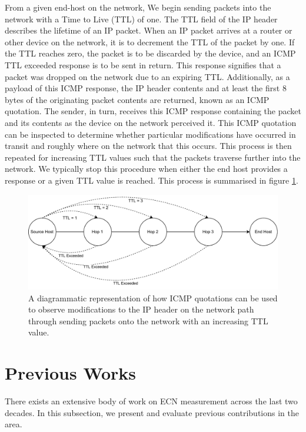 \documentclass{l4proj}
\begin{document}
From a given end-host on the network, We begin sending packets into the network with a Time to Live (TTL) of one. The TTL field of the IP header describes the lifetime of an IP packet. When an IP packet arrives at a router or other device on the network, it is to decrement the TTL of the packet by one. If the TTL reaches zero, the packet is to be discarded by the device, and an ICMP TTL exceeded response is to be sent in return. This response signifies that a packet was dropped on the network due to an expiring TTL.
Additionally, as a payload of this ICMP response, the IP header contents and at least the first 8 bytes of the originating packet contents are returned, known as an ICMP quotation. The sender, in turn, receives this ICMP response containing the packet and its contents as the device on the network perceived it. This ICMP quotation can be inspected to determine whether particular modifications have occurred in transit and roughly where on the network that this occurs. This process is then repeated for increasing TTL values such that the packets traverse further into the network. We typically stop this procedure when either the end host provides a response or a given TTL value is reached. This process is summarised in figure \ref{fig:icmp}.

\begin{figure}[H]

\centering
\includegraphics[width=14cm,keepaspectratio]{dissertation/images/icmp.pdf}
\caption{A diagrammatic representation of how ICMP quotations can be used to observe modifications to the IP header on the network path through sending packets onto the network with an increasing TTL value.}
\label{fig:icmp}
\end{figure}

\section{Previous Works}

There exists an extensive body of work on ECN measurement across the last two decades. In this subsection, we present and evaluate previous contributions in the area.
\end{document}

